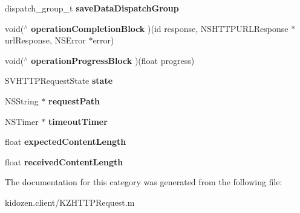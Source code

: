 \begin{DoxyCompactItemize}
\item 
\hypertarget{category_k_z_h_t_t_p_request_07_08_a90c024ad9a8a5c2a851946f985b36347}{dispatch\-\_\-group\-\_\-t {\bfseries save\-Data\-Dispatch\-Group}}\label{category_k_z_h_t_t_p_request_07_08_a90c024ad9a8a5c2a851946f985b36347}

\item 
\hypertarget{category_k_z_h_t_t_p_request_07_08_aa23332e7e8bcd363fd3064ced416b7b3}{void($^\wedge$ {\bfseries operation\-Completion\-Block} )(id response, N\-S\-H\-T\-T\-P\-U\-R\-L\-Response $\ast$url\-Response, N\-S\-Error $\ast$error)}\label{category_k_z_h_t_t_p_request_07_08_aa23332e7e8bcd363fd3064ced416b7b3}

\item 
\hypertarget{category_k_z_h_t_t_p_request_07_08_a208c1d8706eccff3c0b29f12187ef24f}{void($^\wedge$ {\bfseries operation\-Progress\-Block} )(float progress)}\label{category_k_z_h_t_t_p_request_07_08_a208c1d8706eccff3c0b29f12187ef24f}

\item 
\hypertarget{category_k_z_h_t_t_p_request_07_08_a4673cc4a3f59768806e9789e5ef8b5d8}{S\-V\-H\-T\-T\-P\-Request\-State {\bfseries state}}\label{category_k_z_h_t_t_p_request_07_08_a4673cc4a3f59768806e9789e5ef8b5d8}

\item 
\hypertarget{category_k_z_h_t_t_p_request_07_08_a31e37446d6fa7ee12d457944b0c83fba}{N\-S\-String $\ast$ {\bfseries request\-Path}}\label{category_k_z_h_t_t_p_request_07_08_a31e37446d6fa7ee12d457944b0c83fba}

\item 
\hypertarget{category_k_z_h_t_t_p_request_07_08_a1132f43d27beddeddf8ac237090d313f}{N\-S\-Timer $\ast$ {\bfseries timeout\-Timer}}\label{category_k_z_h_t_t_p_request_07_08_a1132f43d27beddeddf8ac237090d313f}

\item 
\hypertarget{category_k_z_h_t_t_p_request_07_08_ae4dee6838340ec2f615d8e90d303871c}{float {\bfseries expected\-Content\-Length}}\label{category_k_z_h_t_t_p_request_07_08_ae4dee6838340ec2f615d8e90d303871c}

\item 
\hypertarget{category_k_z_h_t_t_p_request_07_08_a74b624127a792ca92dd0da73ff619efa}{float {\bfseries received\-Content\-Length}}\label{category_k_z_h_t_t_p_request_07_08_a74b624127a792ca92dd0da73ff619efa}

\end{DoxyCompactItemize}


The documentation for this category was generated from the following file\-:\begin{DoxyCompactItemize}
\item 
kidozen.\-client/K\-Z\-H\-T\-T\-P\-Request.\-m\end{DoxyCompactItemize}
